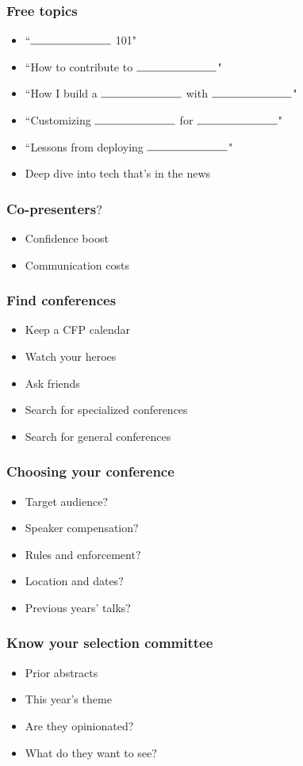 \documentclass{beamer}
\begin{document}
\begin{frame}[fragile]
\frametitle{Free topics}
\begin{itemize}
\item ``$\rule{1in}{0.15mm}$ 101"
\item ``How to contribute to $\rule{1in}{0.15mm}$"
\item ``How I build a $\rule{1in}{0.15mm}$ with $\rule{1in}{0.15mm}$"
\item ``Customizing $\rule{1in}{0.15mm}$ for $\rule{1in}{0.15mm}$"
\item ``Lessons from deploying $\rule{1in}{0.15mm}$"
\item Deep dive into tech that's in the news
\end{itemize}
\end{frame}

\begin{frame}[fragile]
\frametitle{Co-presenters$?$}
\begin{itemize}
\item Confidence boost
\item Communication costs
\end{itemize}
\end{frame}

\begin{frame}[fragile]
\frametitle{Find conferences}
\begin{itemize}
\item Keep a CFP calendar
\item Watch your heroes
\item Ask friends
\item Search for specialized conferences
\item Search for general conferences
\end{itemize}
\end{frame}

\begin{frame}[fragile]
\frametitle{Choosing your conference}
\begin{itemize}
\item Target audience$?$
\item Speaker compensation$?$
\item Rules and enforcement$?$
\item Location and dates$?$
\item Previous years' talks$?$
\end{itemize}
\end{frame}

\begin{frame}[fragile]
\frametitle{Know your selection committee}
\begin{itemize}
\item Prior abstracts
\item This year's theme
\item Are they opinionated$?$
\item What do they want to see$?$
\end{itemize}
\end{frame}
\end{document}

